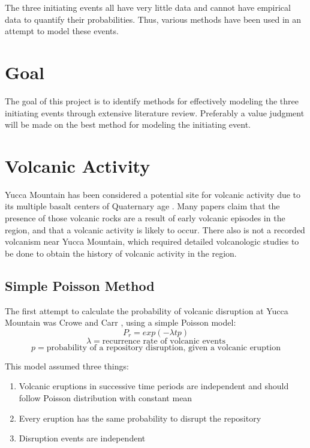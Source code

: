 \documentclass[12pt]{article}
\begin{document}
The three initiating events all have very little data
and cannot have empirical data to quantify their probabilities. Thus,
various methods have been used in an attempt to model these events.

\section{Goal}
The goal of this project is to identify methods for effectively
modeling the three initiating events through extensive literature review.
Preferably a value judgment will be made on the best method
for modeling the initiating event. 


\section{Volcanic Activity}
Yucca Mountain has been considered a potential site
for volcanic activity due to its multiple basalt centers 
of Quaternary age \cite{management_environmental_1986}.
Many papers \cite{crowe_volcanism:_2006, crowe_status_1995}claim that
the presence of those volcanic rocks are a result of early volcanic episodes in the region,
and that a volcanic activity is likely to occur.
There also is not a recorded volcanism near Yucca Mountain, which required
detailed volcanologic studies to be done to obtain the history of 
volcanic activity in the region.

\subsection{Simple Poisson Method}
The first attempt to calculate the probability of volcanic disruption
at Yucca Mountain was Crowe and Carr \cite{crowe_preliminary_1980}, using 
a simple Poisson model:
\[P_r = exp(-\lambda t p)\]
\[\lambda = \text{recurrence rate of volcanic events}\]
\[p = \text{probability of a repository disruption, given a volcanic eruption}\]

This model assumed three things:

\begin{enumerate}
    \item Volcanic eruptions in successive time periods are independent
     and should follow Poisson distribution with constant mean\\
    \item Every eruption has the same probability to disrupt the repository \\
    \item Disruption events are independent \\
\end{enumerate}
\end{document}
